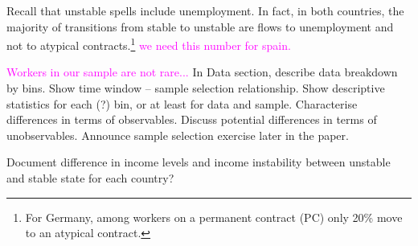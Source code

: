 \documentclass[12pt]{article}
\theoremstyle{definition}
\theoremstyle{remark}
\begin{document}

Recall that unstable spells include unemployment. In fact, 
in both countries, the majority of transitions from stable to unstable are flows to unemployment and not to atypical contracts.\footnote{For Germany, among workers on a permanent contract (PC) only 20\% move to an atypical contract.}
\textcolor{magenta}{we need this number for spain.}

\textcolor{magenta}{Workers in our sample are not rare... }
\textcolor{mygreen}{In Data section, describe data breakdown by bins. Show time window – sample selection relationship. Show descriptive statistics for each (?) bin, or at least for data and sample. Characterise differences in terms of observables. Discuss potential differences in terms of unobservables. Announce sample selection exercise later in the paper.}

\textcolor{mygreen}{Document difference in income levels and income instability between unstable and stable state for each country?}


\end{document}
